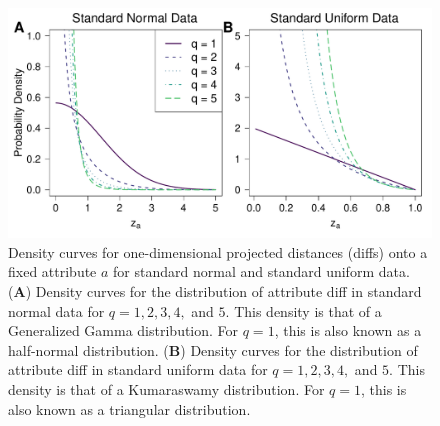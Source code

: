 \documentclass[10pt,letterpaper]{article}\usepackage[]{graphicx}\usepackage[]{color}
\begin{document}
\begin{figure}[H]
	\includegraphics[width=\textwidth]{standard_normal_and_uniform_diffs.pdf}
	\caption{Density curves for one-dimensional projected distances (diffs) onto a fixed attribute $a$ for standard normal and standard uniform data. (\textbf{A}) Density curves for the distribution of attribute diff in standard normal data for $q=1,2,3,4,$ and $5$. This density is that of a Generalized Gamma distribution. For $q=1$, this is also known as a half-normal distribution. (\textbf{B}) Density curves for the distribution of attribute diff in standard uniform data for $q=1,2,3,4,$ and $5$. This density is that of a Kumaraswamy distribution. For $q=1$, this is also known as a triangular distribution.}
\end{figure}
\end{document}
